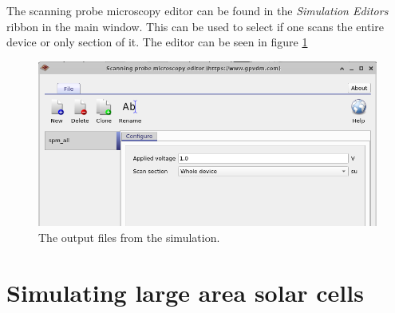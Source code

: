 The scanning probe microscopy editor can be found in the \emph{Simulation Editors} ribbon in the main window. This can be used to select if one scans the entire device or only section of it. The editor can be seen in figure \ref{fig:spmeditor} 
\begin{figure}[H]
\centering
\includegraphics[width=\textwidth]{./images/la_7.png}
\caption{The output files from the simulation.}
\label{fig:spmeditor}
\end{figure}

\section{Simulating large area solar cells}


